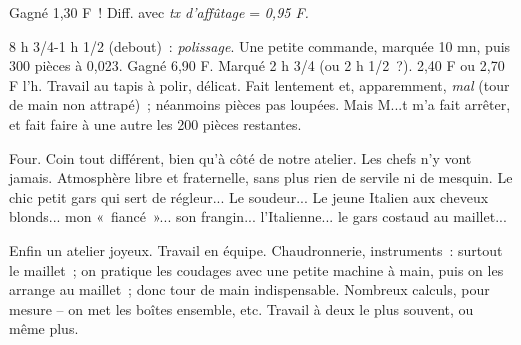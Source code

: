 \documentclass[french,twoside]{book} %
\begin{document}
Gagné 1,30 F ! Diff. avec {\itshape tx d'affûtage} = {\itshape 0,95 F.}\par
\par
8 h 3/4-1 h 1/2 (debout) : {\itshape polissage}. Une petite commande, marquée 10 mn, puis 300 pièces à 0,023. Gagné 6,90 F. Marqué 2 h 3/4 (ou 2 h 1/2 ?). 2,40 F ou 2,70 F l'h. Travail au tapis à polir, délicat. Fait lentement et, apparemment, {\itshape mal} (tour de main non attrapé) ; néanmoins pièces pas loupées. Mais M...t m'a fait arrêter, et fait faire à une autre les 200 pièces restantes.\par
Four. Coin tout différent, bien qu'à côté de notre atelier. Les chefs n'y vont jamais. Atmosphère libre et fraternelle, sans plus rien de servile ni de mesquin. Le chic petit gars qui sert de régleur... Le soudeur... Le jeune Italien aux cheveux blonds... mon « fiancé »... son frangin... l'Italienne... le gars costaud au maillet...\par
Enfin un atelier joyeux. Travail en équipe. Chaudronnerie, instruments : surtout le maillet ; on pratique les coudages avec une petite machine à main, puis on les arrange au maillet ; donc tour de main indispensable. Nombreux calculs, pour mesure – on met les boîtes ensemble, etc. Travail à deux le plus souvent, ou même plus.\par
\end{document}
